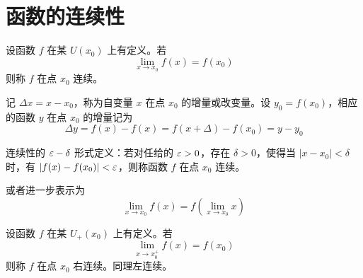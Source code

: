 
\section{函数的连续性}

\begin{definition}[连续性]
	设函数 $f$ 在某 $U(x_0)$ 上有定义。若
	\[ \lim_{x\to x_0}f(x) = f(x_0) \]
	则称 $f$ 在点 $x_0$ 连续。
\end{definition}

记 $\Delta x = x-x_0$，称为自变量 $x$ 在点 $x_0$ 的增量或改变量。设 $y_0=f(x_0)$，相应的函数 $y$ 在点 $x_0$ 的增量记为
\[ \Delta y = f(x)-f(x) = f(x+\Delta)-f(x_0) = y-y_0 \]

连续性的 $\varepsilon-\delta$ 形式定义：若对任给的 $\varepsilon>0$，存在 $\delta>0$，使得当 $|x-x_0|<\delta$ 时，有 $|f(x)-f(x_0)|<\varepsilon$，则称函数 $f$ 在点 $x_0$ 连续。

或者进一步表示为
\[ \lim_{x\to x_0}f(x) = f\left(\lim_{x\to x_0}x\right) \]

\begin{definition}
	设函数 $f$ 在某 $U_+(x_0)$ 上有定义。若
	\[ \lim_{x\to x_0^+}f(x) = f(x_0) \]
	则称 $f$ 在点 $x_0$ 右连续。同理左连续。
\end{definition}

